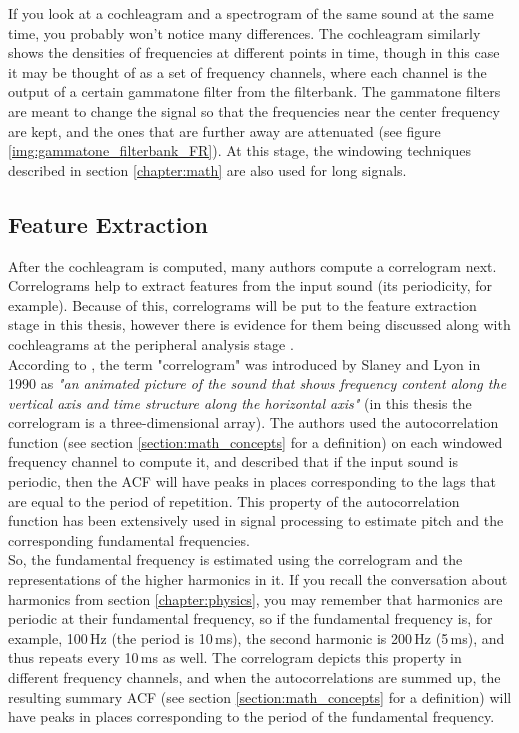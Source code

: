 If you look at a cochleagram and a spectrogram of the same sound at the same time, you probably won't notice many differences. The cochleagram similarly shows the densities of frequencies at different points in time, though in this case it may be thought of as a set of frequency channels, where each channel is the output of a certain gammatone filter from the filterbank. The gammatone filters are meant to change the signal so that the frequencies near the center frequency are kept, and the ones that are further away are attenuated (see figure \ref{img:gammatone_filterbank_FR}). At this stage, the windowing techniques described in section \ref{chapter:math} are also used for long signals.


\subsection{Feature Extraction}\label{subsection:casa_feature_extraction}

After the cochleagram is computed, many authors compute a correlogram next. Correlograms help to extract features from the input sound (its periodicity, for example). Because of this, correlograms will be put to the feature extraction stage in this thesis, however there is evidence for them being discussed along with cochleagrams at the peripheral analysis stage \cite{Jasti2020}.\\

According to \cite{Wang2006}, the term "correlogram" was introduced by Slaney and Lyon in 1990 \cite{Slaney1990} as \textit{"an animated picture of the sound that shows frequency content along the vertical axis and time structure along the horizontal axis"} (in this thesis the correlogram is a three-dimensional array). The authors used the autocorrelation function (see section \ref{section:math_concepts} for a definition) on each windowed frequency channel to compute it, and described that if the input sound is periodic, then the ACF will have peaks in places corresponding to the lags that are equal to the period of repetition. This property of the autocorrelation function has been extensively used in signal processing to estimate pitch and the corresponding fundamental frequencies.\\

So, the fundamental frequency is estimated using the correlogram and the representations of the higher harmonics in it. If you recall the conversation about harmonics from section \ref{chapter:physics}, you may remember that harmonics are periodic at their fundamental frequency, so if the fundamental frequency is, for example, 100\,Hz (the period is 10\,ms), the second harmonic is 200\,Hz (5\,ms), and thus repeats every 10\,ms as well. The correlogram depicts this property in different frequency channels, and when the autocorrelations are summed up, the resulting summary ACF (see section \ref{section:math_concepts} for a definition) will have peaks in places corresponding to the period of the fundamental frequency.\\

